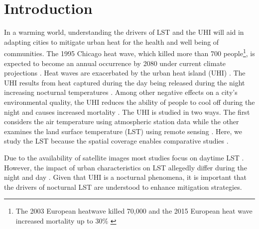 \documentclass[]{elsarticle}
\begin{document}
\linenumbers

\section{Introduction}
In a warming world, understanding the drivers of LST and the UHI will aid in adapting cities to mitigate urban heat for the health and well being of communities.
The 1995 Chicago heat wave, which killed more than 700 people\footnote{The 2003 European heatwave killed 70,000 \cite{Robine 2008} and the 2015 European heat wave increased mortality up to 30\% \cite{Vicedo-Cabrera 2016 in Wicki} }, is expected to become an annual occurrence by 2080 under current climate projections \cite{klinenberg2015heat}. 
Heat waves are exacerbated by the urban heat island (UHI) \cite{Wicki2017-fv, Echevarria_Icaza2016-fr}.
The UHI results from heat captured during the day being released during the night increasing nocturnal temperatures \cite{Oke 1987, Landsberg1981, Rotach2005(bubble)}.
Among other negative effects on a city's environmental quality, the UHI reduces the ability of people to cool off during the night and causes increased mortality \cite{Stone2006}.
The UHI is studied in two ways.
The first considers the air temperature using atmospheric station data \cite{Scott2016-lc, etc} while the other examines the land surface temperature (LST) using remote sensing \cite{imhoff, Peng2012-iy, Peng2018-cp, Zhou2014-wc, etc.}. 
Here, we study the LST because the spatial coverage enables comparative studies \cite{Hung2006-qy}.

Due to the availability of satellite images most studies focus on daytime LST \cite{examples looking at day LST}.
However, the impact of urban characteristics on LST allegedly differ during the night and day \cite{Hung2006-qy, Chun2017-mm, Nichol2005-mm, Wicki2017-fv, Echevarria_Icaza2016-fr,Sobstyl2018-wt, Peng2012-iy, Zhou2014-wc, Zhao2017-cc}. 
Given that UHI is a nocturnal phenomena, it is important that the drivers of nocturnal LST are understood to enhance mitigation strategies. 
\end{document}
